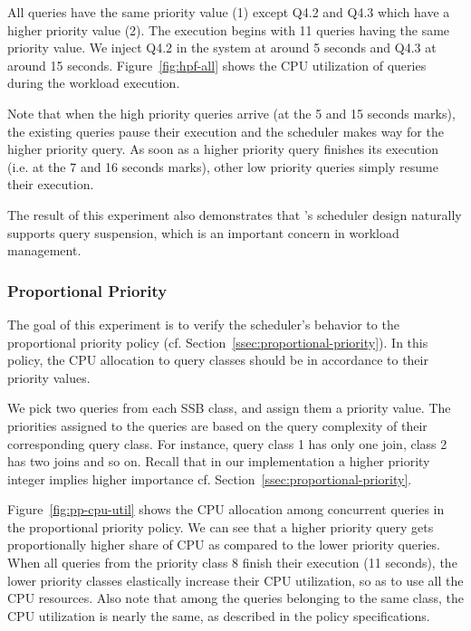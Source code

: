 All queries have the same priority value (1) except Q4.2 and Q4.3 which have a higher priority value (2). 
The execution begins with 11 queries having the same priority value. %
We inject Q4.2 in the system at around 5 seconds and Q4.3 at around 15 seconds.
Figure~\ref{fig:hpf-all} shows the CPU utilization of queries during the workload 
execution.

Note that when the high priority queries arrive (at the 5 and 15 seconds marks), the existing queries pause their execution and the scheduler makes way for the higher priority query.
As soon as a higher priority query finishes its execution (i.e. at the 7 and 16 seconds marks), other low priority queries simply resume their execution.

The result of this experiment also demonstrates that \sys{}'s scheduler design naturally supports query suspension, which is an important concern in workload management. 

\subsubsection{Proportional Priority}\label{sssec:pp-policy-exp}
The goal of this experiment is to verify the scheduler's behavior to the proportional priority policy (cf. Section~\ref{ssec:proportional-priority}).
In this policy, the CPU allocation to query classes should be in accordance to their priority values.

We pick two queries from each SSB class, and assign them a priority value. 
The priorities assigned to the queries are based on the query complexity of their corresponding query class. 
For instance, query class 1 has only one join, class 2 has two joins and so on.
Recall that in our implementation a higher priority integer implies higher importance cf. 
Section~\ref{ssec:proportional-priority}.

Figure~\ref{fig:pp-cpu-util} shows the CPU allocation among concurrent queries in the proportional priority policy.
We can see that a higher priority query gets proportionally higher share of CPU as 
compared to the lower priority queries.
When all queries from the priority class 8 finish their execution (11 seconds), the 
lower priority classes elastically increase their CPU utilization, so as to use all the CPU 
resources. 
Also note that among the queries belonging to the same class, the CPU utilization is 
nearly the same, as described in the policy specifications.

